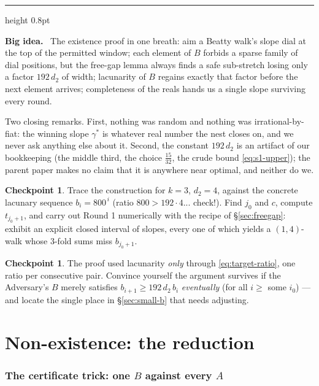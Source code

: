 \documentclass[11pt,reqno]{amsart}
\theoremstyle{plain}
\theoremstyle{definition}
\newtheorem{checkpoint}[theorem]{Checkpoint}   %
\theoremstyle{remark}
\newenvironment{bigidea}
  {\par\medskip\noindent\hspace*{0.02\linewidth}%
   \begin{minipage}{0.96\linewidth}
   {\color{blue!55!black}\hrule height 0.8pt}\vspace{6pt}
   \noindent\textbf{Big idea.}\ }
  {\par\vspace{6pt}{\color{blue!55!black}\hrule height 0.8pt}%
   \end{minipage}\par\medskip}
\begin{document}
\begin{bigidea}
The existence proof in one breath: aim a Beatty walk's slope dial at the top of the
permitted window; each element of $B$ forbids a sparse family of dial positions, but
the free-gap lemma always finds a safe sub-stretch losing only a factor $192\,d_2$ of
width; lacunarity of $B$ regains exactly that factor before the next element arrives;
completeness of the reals hands us a single slope surviving every round.
\end{bigidea}

Two closing remarks. First, nothing was random and nothing was irrational-by-fiat:
the winning slope $\gamma^*$ is whatever real number the nest closes on, and we never
ask anything else about it. Second, the constant $192\,d_2$ is an artifact of our
bookkeeping (the middle third, the choice $\tfrac{15}{32}$, the crude bound
\eqref{eq:s1-upper}); the parent paper makes no claim that it is anywhere near
optimal, and neither do we.

\begin{checkpoint}
Trace the construction for $k = 3$, $d_2 = 4$, against the concrete lacunary sequence
$b_i = 800^{\,i}$ (ratio $800 > 192 \cdot 4$... check!). Find $j_0$ and $c$, compute
$t_{j_0+1}$, and carry out Round 1 numerically with the recipe of
\S\ref{sec:freegap}: exhibit an explicit closed interval of slopes, every one of
which yields a $(1,4)$-walk whose $3$-fold sums miss $b_{j_0+1}$.
\end{checkpoint}

\begin{checkpoint}
The proof used lacunarity \emph{only} through \eqref{eq:target-ratio}, one ratio per
consecutive pair. Convince yourself the argument survives if the Adversary's $B$
merely satisfies $b_{i+1} \ge 192\,d_2\,b_i$ \emph{eventually} (for all $i \ge$ some
$i_0$) --- and locate the single place in \S\ref{sec:small-b} that needs adjusting.
\end{checkpoint}

\part{Non-existence: the reduction}

\section{The certificate trick: one \texorpdfstring{$B$}{B} against every \texorpdfstring{$A$}{A}}\label{sec:cert}
\end{document}
